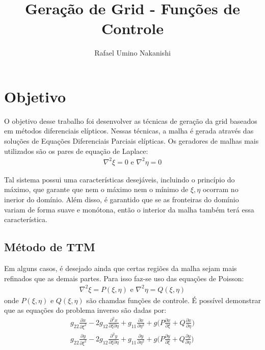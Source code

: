 \documentclass{article}
\title{Geração de Grid - Funções de Controle}
\author{Rafael Umino Nakanishi}
\date{}
\newcommand{\diff}[2]{
	\frac{\partial #1}{\partial #2}
}
\newcommand{\diffxixi}[1]{
	\diff{#1}{\xi^2}
}
\newcommand{\diffetaeta}[1]{
	\diff{#1}{\eta^2}
}
\newcommand{\diffxieta}[1]{
	\diff{^2#1}{\xi\partial\eta}
}
\newcommand{\diffxi}[1]{
	\diff{#1}{\xi}
}
\newcommand{\diffeta}[1]{
	\diff{#1}{\eta}
}
\begin{document}
	\maketitle

	\section{Objetivo} %
	\label{sec:objetivo}
		O objetivo desse trabalho foi desenvolver as técnicas de geração da grid baseados em métodos diferenciais elípticos. Nessas técnicas, a malha é gerada através das soluções de Equações Diferenciais Parciais elípticas. Os geradores de malhas mais utilizados são os pares de equação de Laplace:
		\begin{eqnarray}
			\nabla^2\xi = 0 \text{  e  } \nabla^2\eta = 0 
		\end{eqnarray}

		Tal sistema possui uma características desejáveis, incluindo o princípio do máximo, que garante que nem o máximo nem o mínimo de $\xi, \eta$ ocorram no inerior do domínio. Além disso, é garantido que se as fronteiras do domínio variam de forma suave e monótona, então o interior da malha também terá essa característica.

		\subsection{Método de TTM} %
		\label{sec:ttm-method}
			Em alguns casos, é desejado ainda que certas regiões da malha sejam mais refinados que as demais partes. Para isso faz-se uso das equações de Poisson:
			\begin{eqnarray}
				\nabla^2\xi = P(\xi, \eta) \text{  e  } \nabla^2\eta = Q(\xi, \eta) \label{eqn:poisson}
			\end{eqnarray}
			onde $P(\xi,\eta)$ e $Q(\xi,\eta)$ são chamdas funções de controle. É possível demonstrar que as equações do problema inverso são dadas por:
			\begin{eqnarray}
			\label{eqn:ttm}
				g_{22}\diffxixi{x} - 2g_{12}\diffxieta{x} + g_{11}\diffetaeta{x} + g \Big(P\diffxi{x}+Q\diffeta{x}\Big)\\ \nonumber
				g_{22}\diffxixi{y} - 2g_{12}\diffxieta{y} + g_{11}\diffetaeta{y} + g \Big(P\diffxi{y}+Q\diffeta{y}\Big)
			\end{eqnarray}
\end{document}
